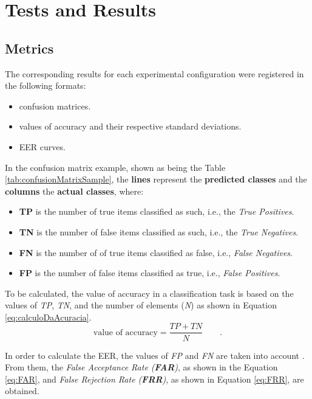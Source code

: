 \section{Tests and Results}
\label{sec:testsResults}
\subsection{Metrics}
\par The corresponding results for each experimental configuration were registered in the following formats:
		\begin{itemize}
			\item{} confusion matrices.
			\item{} values of accuracy and their respective standard deviations.
			\item{} EER curves.
		\end{itemize}
\par In the confusion matrix example, shown as being the Table \ref{tab:confusionMatrixSample}, the \textbf{lines} represent the \textbf{predicted classes} and the \textbf{columns} the \textbf{actual classes}, where:
\begin{itemize}
			\item{}\textbf{TP} is the number of true items classified as such, i.e., the \textit{True Positives}.
			\item{}\textbf{TN} is the number of false items classified as such, i.e., the \textit{True Negatives}.
			\item{}\textbf{FN} is the number of of true items classified as false, i.e., \textit{False Negatives}.
			\item{}\textbf{FP} is the number of false items classified as true, i.e., \textit{False Positives}.
		\end{itemize}

To be calculated, the value of accuracy in a classification task is based on the values of \textit{TP}, \textit{TN}, and the number of elements (\textit{N}) as shown in Equation \ref{eq:calculoDaAcuracia}.
\begin{equation}
\text{value of accuracy} = \dfrac{TP + TN}{N} \qquad.
\label{eq:calculoDaAcuracia}
\end{equation}
\par In order to calculate the EER, the values of \textit{FP} and \textit{FN} are taken into account \cite{ghazali2018recent}. From them, the \textit{False Acceptance Rate (\textbf{FAR})}, as shown in the Equation \ref{eq:FAR}, and \textit{False Rejection Rate (\textbf{FRR})}, as shown in Equation \ref{eq:FRR}, are obtained.
